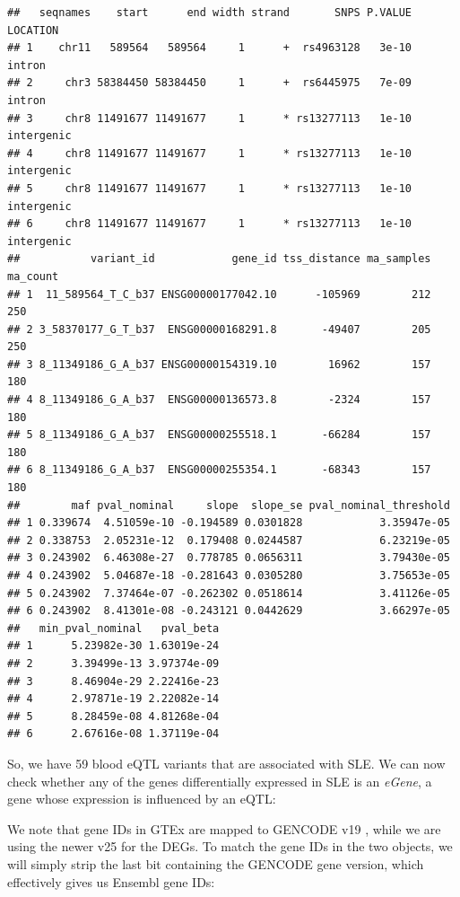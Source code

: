 \documentclass[9pt,a4paper,]{extarticle}
\begin{document}
\begin{verbatim}
##   seqnames    start      end width strand       SNPS P.VALUE   LOCATION
## 1    chr11   589564   589564     1      +  rs4963128   3e-10     intron
## 2     chr3 58384450 58384450     1      +  rs6445975   7e-09     intron
## 3     chr8 11491677 11491677     1      * rs13277113   1e-10 intergenic
## 4     chr8 11491677 11491677     1      * rs13277113   1e-10 intergenic
## 5     chr8 11491677 11491677     1      * rs13277113   1e-10 intergenic
## 6     chr8 11491677 11491677     1      * rs13277113   1e-10 intergenic
##           variant_id            gene_id tss_distance ma_samples ma_count
## 1  11_589564_T_C_b37 ENSG00000177042.10      -105969        212      250
## 2 3_58370177_G_T_b37  ENSG00000168291.8       -49407        205      250
## 3 8_11349186_G_A_b37 ENSG00000154319.10        16962        157      180
## 4 8_11349186_G_A_b37  ENSG00000136573.8        -2324        157      180
## 5 8_11349186_G_A_b37  ENSG00000255518.1       -66284        157      180
## 6 8_11349186_G_A_b37  ENSG00000255354.1       -68343        157      180
##        maf pval_nominal     slope  slope_se pval_nominal_threshold
## 1 0.339674  4.51059e-10 -0.194589 0.0301828            3.35947e-05
## 2 0.338753  2.05231e-12  0.179408 0.0244587            6.23219e-05
## 3 0.243902  6.46308e-27  0.778785 0.0656311            3.79430e-05
## 4 0.243902  5.04687e-18 -0.281643 0.0305280            3.75653e-05
## 5 0.243902  7.37464e-07 -0.262302 0.0518614            3.41126e-05
## 6 0.243902  8.41301e-08 -0.243121 0.0442629            3.66297e-05
##   min_pval_nominal   pval_beta
## 1      5.23982e-30 1.63019e-24
## 2      3.39499e-13 3.97374e-09
## 3      8.46904e-29 2.22416e-23
## 4      2.97871e-19 2.22082e-14
## 5      8.28459e-08 4.81268e-04
## 6      2.67616e-08 1.37119e-04
\end{verbatim}

So, we have 59 blood eQTL variants that are associated with SLE.
We can now check whether any of the genes differentially expressed in SLE is an \emph{eGene}, a gene whose expression is influenced by an eQTL:

We note that gene IDs in GTEx are mapped to GENCODE v19 \citep{GTEx2017a}, while we are using the newer v25 for the DEGs.
To match the gene IDs in the two objects, we will simply strip the last bit containing the GENCODE gene version, which effectively gives us Ensembl gene IDs:
\end{document}
